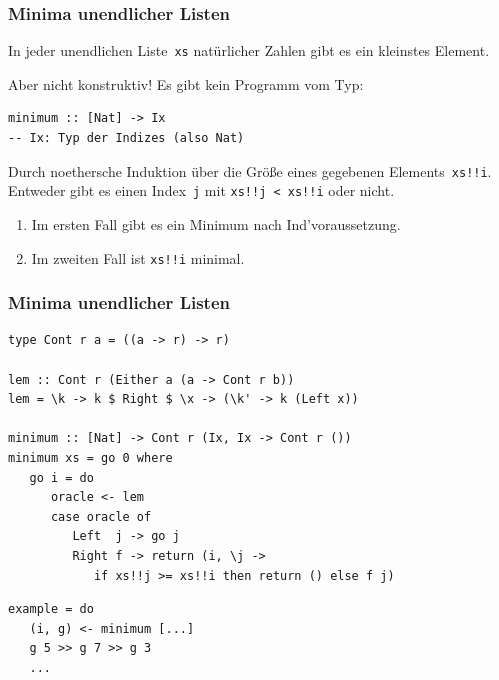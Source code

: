 \documentclass[12pt,utf8,notheorems,compress,t]{beamer}
\renewcommand{\_}{\mathpunct{.}}
\newcommand{\?}{\,{:}\,}
\newcommand{\hil}[1]{{\usebeamercolor[fg]{item}{\textbf{#1}}}}
\begin{document}
\begin{frame}[fragile]\frametitle{Minima unendlicher Listen}
  \hil{Satz.} In jeder unendlichen Liste~\texttt{xs} natürlicher Zahlen gibt es
  ein kleinstes Element.

  Aber nicht konstruktiv! Es gibt kein Programm vom Typ:
  \begin{center}
    \begin{minipage}{0.65\textwidth}
      \begin{verbatim}
minimum :: [Nat] -> Ix
-- Ix: Typ der Indizes (also Nat)
      \end{verbatim}
    \end{minipage}
  \end{center}

  \pause
  \hil{Beweis.} Durch noethersche Induktion über die Größe eines gegebenen
  Elements~\texttt{xs!!i}.
  Entweder gibt es einen Index~\texttt{j} mit \texttt{xs!!j < xs!!i} oder nicht.
  \begin{enumerate}
    \item Im ersten Fall gibt es ein Minimum nach Ind'voraussetzung.
    \item Im zweiten Fall ist \texttt{xs!!i} minimal.
  \end{enumerate}
\end{frame}

\begin{frame}[fragile]\frametitle{Minima unendlicher Listen}
  \begin{verbatim}
type Cont r a = ((a -> r) -> r)

lem :: Cont r (Either a (a -> Cont r b))
lem = \k -> k $ Right $ \x -> (\k' -> k (Left x))

minimum :: [Nat] -> Cont r (Ix, Ix -> Cont r ())
minimum xs = go 0 where
   go i = do
      oracle <- lem
      case oracle of
         Left  j -> go j
         Right f -> return (i, \j ->
            if xs!!j >= xs!!i then return () else f j)
  \end{verbatim}
  \pause
  \begin{verbatim}
example = do
   (i, g) <- minimum [...]
   g 5 >> g 7 >> g 3
   ...
  \end{verbatim}
\end{frame}

\end{document}
